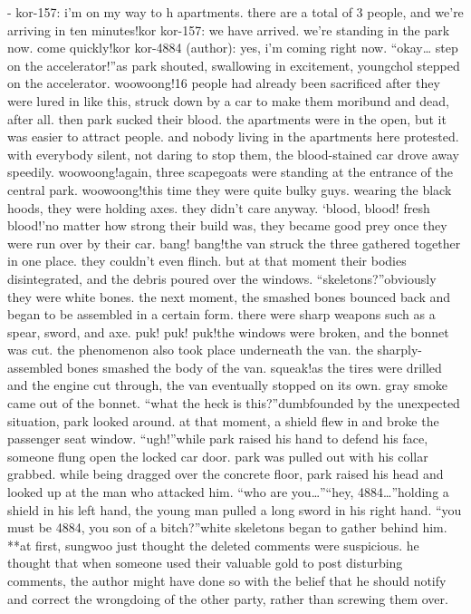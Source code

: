 - kor-157: i’m on my way to h apartments.
 there are a total of 3 people, and we’re arriving in ten minutes!kor kor-157: we have arrived.
 we’re standing in the park now.
 come quickly!kor kor-4884 (author): yes, i’m coming right now.
“okay… step on the accelerator!”as park shouted, swallowing in excitement, youngchol stepped on the accelerator.
woowoong!16 people had already been sacrificed after they were lured in like this, struck down by a car to make them moribund and dead, after all.
 then park sucked their blood.
 the apartments were in the open, but it was easier to attract people.
 and nobody living in the apartments here protested.
with everybody silent, not daring to stop them, the blood-stained car drove away speedily.
woowoong!again, three scapegoats were standing at the entrance of the central park.
woowoong!this time they were quite bulky guys.
 wearing the black hoods, they were holding axes.
 they didn’t care anyway.
‘blood, blood! fresh blood!’no matter how strong their build was, they became good prey once they were run over by their car.
bang! bang!the van struck the three gathered together in one place.
 they couldn’t even flinch.
but at that moment their bodies disintegrated, and the debris poured over the windows.
“skeletons?”obviously they were white bones.
the next moment, the smashed bones bounced back and began to be assembled in a certain form.
 there were sharp weapons such as a spear, sword, and axe.
puk! puk! puk!the windows were broken, and the bonnet was cut.
 the phenomenon also took place underneath the van.
 the sharply-assembled bones smashed the body of the van.
squeak!as the tires were drilled and the engine cut through, the van eventually stopped on its own.
gray smoke came out of the bonnet.
“what the heck is this?”dumbfounded by the unexpected situation, park looked around.
 at that moment, a shield flew in and broke the passenger seat window.
“ugh!”while park raised his hand to defend his face, someone flung open the locked car door.
 park was pulled out with his collar grabbed.
 while being dragged over the concrete floor, park raised his head and looked up at the man who attacked him.
“who are you…”“hey, 4884…”holding a shield in his left hand, the young man pulled a long sword in his right hand.
“you must be 4884, you son of a bitch?”white skeletons began to gather behind him.
**at first, sungwoo just thought the deleted comments were suspicious.
he thought that when someone used their valuable gold to post disturbing comments, the author might have done so with the belief that he should notify and correct the wrongdoing of the other party, rather than screwing them over.
